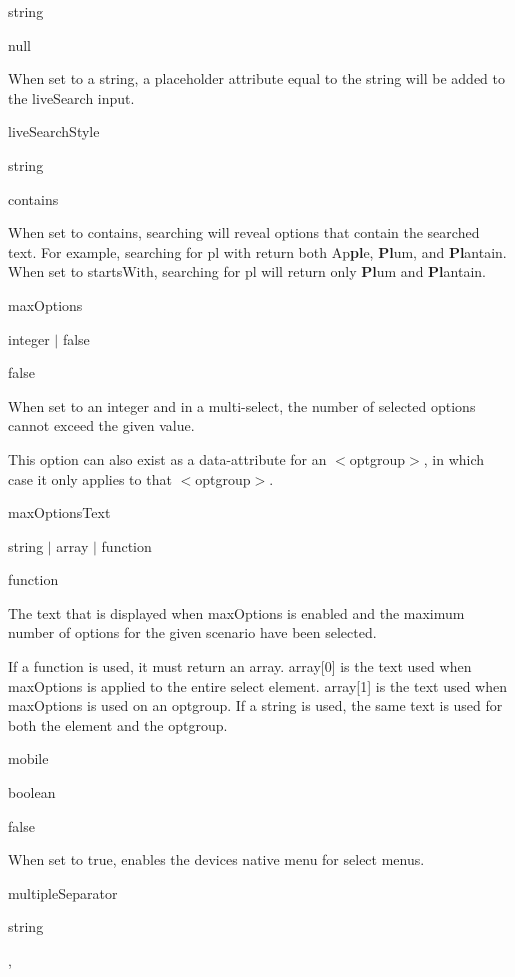 string 

{\ttfamily null} 

When set to a string, a placeholder attribute equal to the string will be added to the live\+Search input.

live\+Search\+Style 

string 

{\ttfamily \textquotesingle{}contains\textquotesingle{}} 

When set to {\ttfamily \textquotesingle{}contains\textquotesingle{}}, searching will reveal options that contain the searched text. For example, searching for pl with return both Ap{\bfseries pl}e, {\bfseries Pl}um, and {\bfseries Pl}antain. When set to {\ttfamily \textquotesingle{}starts\+With\textquotesingle{}}, searching for pl will return only {\bfseries Pl}um and {\bfseries Pl}antain.

max\+Options 

integer $\vert$ false 

{\ttfamily false} 

When set to an integer and in a multi-\/select, the number of selected options cannot exceed the given value.

This option can also exist as a data-\/attribute for an {\ttfamily $<$optgroup$>$}, in which case it only applies to that {\ttfamily $<$optgroup$>$}.

max\+Options\+Text 

string $\vert$ array $\vert$ function 

{\ttfamily function} 

The text that is displayed when max\+Options is enabled and the maximum number of options for the given scenario have been selected.

If a function is used, it must return an array. array\mbox{[}0\mbox{]} is the text used when max\+Options is applied to the entire select element. array\mbox{[}1\mbox{]} is the text used when max\+Options is used on an optgroup. If a string is used, the same text is used for both the element and the optgroup.

mobile 

boolean 

{\ttfamily false} 

When set to {\ttfamily true}, enables the device\textquotesingle{}s native menu for select menus.

multiple\+Separator 

string 

{\ttfamily \textquotesingle{}, \textquotesingle{}} 

